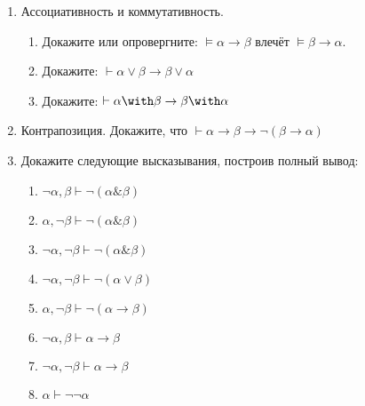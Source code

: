 \documentclass[10pt,a4paper,oneside]{article}
\begin{document}
\begin{enumerate}
\item Ассоциативность и коммутативность.
\begin{enumerate}
\item Докажите или опровергните: $\models \alpha\rightarrow\beta$ влечёт $\models \beta\rightarrow\alpha$.
\item Докажите: $\vdash \alpha\vee\beta \rightarrow \beta\vee\alpha$
\item Докажите: $\vdash \alpha\with\beta \rightarrow \beta\with\alpha$
\end{enumerate}

\item Контрапозиция. Докажите, что $\vdash \alpha\rightarrow\beta \rightarrow \neg (\beta\rightarrow\alpha)$

\item Докажите следующие высказывания, построив полный вывод:
\begin{enumerate}
\item $\neg\alpha,\beta \vdash \neg(\alpha\&\beta)$
\item $\alpha,\neg\beta \vdash \neg(\alpha\&\beta)$
\item $\neg\alpha,\neg\beta \vdash \neg(\alpha\&\beta)$
\item $\neg\alpha,\neg\beta \vdash \neg(\alpha\vee\beta)$
\item $\alpha,\neg\beta \vdash \neg(\alpha\rightarrow\beta)$
\item $\neg\alpha,\beta \vdash \alpha\rightarrow\beta$
\item $\neg\alpha,\neg\beta \vdash \alpha\rightarrow\beta$
\item $\alpha \vdash \neg\neg\alpha$
\end{enumerate}

\end{enumerate}
\end{document}
